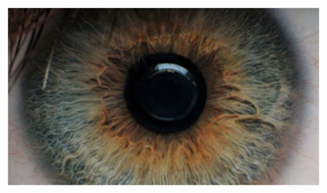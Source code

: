 \documentclass{article}
\begin{document}
\begin{figure}[H]
\begin{subfigure}{.47\textwidth}
  \centering
  \includegraphics[width=0.97\linewidth]{_Figures/raw_data_1_lowpass.png}
  \caption{}
  \label{fig:raw_1_lowpass}
\end{subfigure}




\end{figure}
\end{document}
